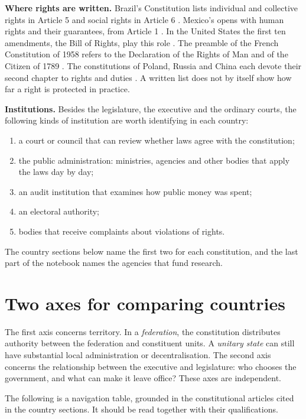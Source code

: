 \textbf{Where rights are written.}
Brazil's Constitution lists individual and
collective rights in Article 5 and social
rights in Article 6
\cite{gsf-br-constitution}. Mexico's opens
with human rights and their guarantees, from
Article 1 \cite{gsf-mx-constitution}. In the
United States the first ten amendments, the
Bill of Rights, play this role
\cite{gsf-us-bill-rights}. The preamble of
the French Constitution of 1958 refers to the
Declaration of the Rights of Man and of the
Citizen of 1789 \cite{gsf-fr-constitution}.
The constitutions of Poland, Russia and China
each devote their second chapter to rights
and duties
\cite{gsf-pl-constitution,gsf-ru-constitution,
gsf-cn-constitution}. A written list does not
by itself show how far a right is protected
in practice.

\textbf{Institutions.}
Besides the legislature, the executive and
the ordinary courts, the following kinds of
institution are worth identifying in each
country:
\begin{enumerate}
\item a court or council that can review
whether laws agree with the constitution;
\item the public administration: ministries,
agencies and other bodies that apply the laws
day by day;
\item an audit institution that examines how
public money was spent;
\item an electoral authority;
\item bodies that receive complaints about
violations of rights.
\end{enumerate}
The country sections below name the first
two for each constitution, and the last part
of the notebook names the agencies that fund
research.

\section{Two axes for comparing countries}
\label{section-gsf-comparison}

The first axis concerns territory.
In a \emph{federation}, the constitution
distributes
authority between the federation and
constituent units.
A \emph{unitary state} can still have
substantial local
administration or decentralisation.
The second axis concerns the relationship
between the
executive and legislature: who chooses the
government,
and what can make it leave office?
These axes are independent.

The following is a navigation table, grounded
in the
constitutional articles cited in the country
sections.
It should be read together with their
qualifications.

